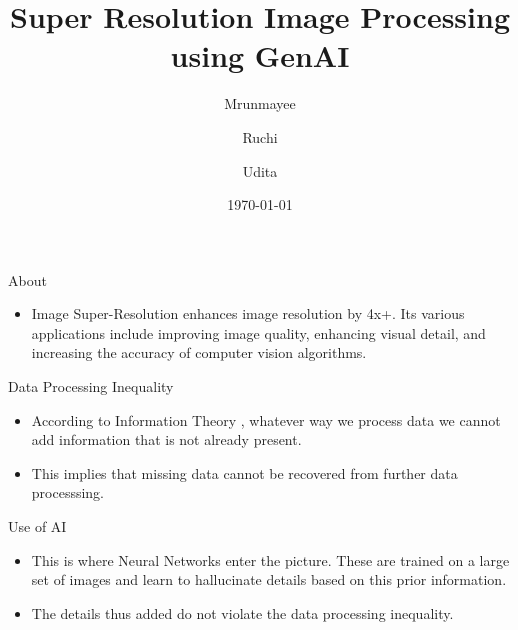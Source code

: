 \documentclass{beamer}
\title{Super Resolution Image Processing using GenAI}
\author{Mrunmayee \and Ruchi  \and Udita}
\institute{WE Cohort V}
\date{\today}
\begin{document}
\maketitle



\begin{frame}{About}
  \begin{itemize}
    \item Image Super-Resolution enhances image resolution by 4x+. Its various applications include improving image quality, enhancing visual detail, and increasing the accuracy of computer vision algorithms.
  \end{itemize}
\end{frame}

\begin{frame}{Data Processing Inequality}
  \begin{itemize}
    \item According to Information Theory , whatever way we process data we cannot add information that is not already present.
    \item This implies that missing data cannot be recovered from further data processsing.
  \end{itemize}
\end{frame}

\begin{frame}{Use of AI}
  \begin{itemize}
    \item This is where Neural Networks enter the picture. These are trained on a large set of images and learn to hallucinate details based on this prior information.
    \item The details thus added do not violate the data processing inequality.
    
  \end{itemize}
\end{frame}
\end{document}

